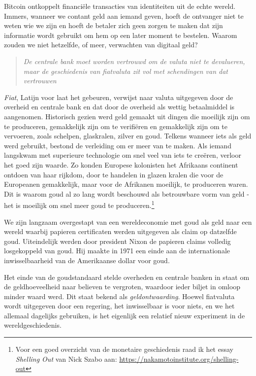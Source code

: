 Bitcoin ontkoppelt financiële transacties van identiteiten uit de echte wereld. Immers, wanneer we contant geld aan iemand geven, hoeft de ontvanger niet te weten wie we zijn en hoeft de betaler zich geen zorgen te maken dat zijn informatie wordt gebruikt om hem op een later moment te bestelen. Waarom zouden we niet hetzelfde, of meer, verwachten van digitaal geld?

\begin{quote}
\textit{De centrale bank moet worden vertrouwd om de valuta niet te devalueren, maar de geschiedenis van fiatvaluta zit vol met schendingen van dat vertrouwen}
\end{quote}

\textit{Fiat}, Latijn voor \textquotedbl{}laat het gebeuren\textquotedbl{}, verwijst naar valuta uitgegeven door de overheid en centrale bank en dat door de overheid als wettig betaalmiddel is aangenomen. Historisch gezien werd geld gemaakt uit dingen die moeilijk zijn om te produceren, gemakkelijk zijn om te verifiëren en gemakkelijk zijn om te vervoeren, zoals schelpen, glaskralen, zilver en goud. Telkens wanneer iets als geld werd gebruikt, bestond de verleiding om er meer van te maken. Als iemand langskwam met superieure technologie om snel veel van iets te creëren, verloor het goed zijn waarde. Zo konden Europese kolonisten het Afrikaans continent ontdoen van haar rijkdom, door te handelen in glazen kralen die voor de Europeanen gemakkelijk, maar voor de Afrikanen moeilijk, te produceren waren. Dit is waarom goud al zo lang wordt beschouwd als betrouwbare vorm van geld - het is moeilijk om snel meer goud te produceren.\footnote{Voor een goed overzicht van de monetaire geschiedenis raad ik het essay \textit{Shelling Out} van Nick Szabo aan: \href{https://nakamotoinstitute.org/shelling-out}{https://nakamotoinstitute.org/shelling-out}}

We zijn langzaam overgestapt van een wereldeconomie met goud als geld naar een wereld waarbij papieren certificaten werden uitgegeven als claim op datzelfde goud. Uiteindelijk werden door president Nixon de papieren claims volledig losgekoppeld van goud. Hij maakte in 1971 een einde aan de internationale inwisselbaarheid van de Amerikaanse dollar voor goud.

Het einde van de goudstandaard stelde overheden en centrale banken in staat om de geldhoeveelheid naar believen te vergroten, waardoor ieder biljet in omloop minder waard werd. Dit staat bekend als \textit{geldontwaarding}. Hoewel fiatvaluta wordt uitgegeven door een regering, het inwisselbaar is voor niets, en we het allemaal dagelijks gebruiken, is het eigenlijk een relatief nieuw experiment in de wereldgeschiedenis.

